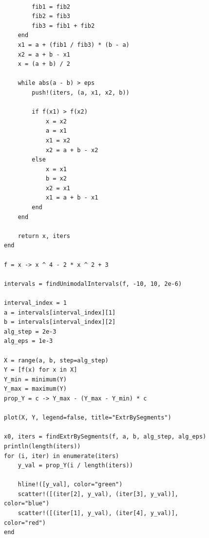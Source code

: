 \documentclass[a4paper, 14pt]{extarticle}
\begin{document}
\begin{figure}[!htb]
\begin{lstlisting}[language={},caption={Нахождение минимумов функции},label={lst:code3}]

        fib1 = fib2
        fib2 = fib3
        fib3 = fib1 + fib2
    end
    x1 = a + (fib1 / fib3) * (b - a)
    x2 = a + b - x1
    x = (a + b) / 2

    while abs(a - b) > eps
        push!(iters, (a, x1, x2, b))

        if f(x1) > f(x2)
            x = x2
            a = x1
            x1 = x2
            x2 = a + b - x2
        else
            x = x1
            b = x2
            x2 = x1
            x1 = a + b - x1
        end
    end

    return x, iters
end

f = x -> x ^ 4 - 2 * x ^ 2 + 3

intervals = findUnimodalIntervals(f, -10, 10, 2e-6)

interval_index = 1
a = intervals[interval_index][1]
b = intervals[interval_index][2]
alg_step = 2e-3
alg_eps = 1e-3

X = range(a, b, step=alg_step)
Y = [f(x) for x in X]
Y_min = minimum(Y)
Y_max = maximum(Y)
prop_Y = c -> Y_max - (Y_max - Y_min) * c

plot(X, Y, legend=false, title="ExtrBySegments")

x0, iters = findExtrBySegments(f, a, b, alg_step, alg_eps)
println(length(iters))
for (i, iter) in enumerate(iters)
    y_val = prop_Y(i / length(iters))

    hline!([y_val], color="green")
    scatter!([(iter[2], y_val), (iter[3], y_val)], color="blue")
    scatter!([(iter[1], y_val), (iter[4], y_val)], color="red")
end
\end{lstlisting}
\end{figure}
\end{document}
